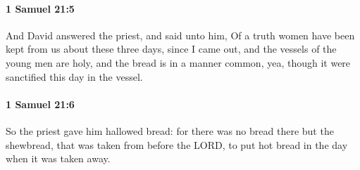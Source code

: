 		\paragraph{1 Samuel 21:5} %
			\label{1SAMUEL-21-5}

			And David answered the priest, and said unto him, Of a truth women have been kept from us about these three days, since I came out, and the vessels of the young men are holy, and the bread is in a manner common, yea, though it were sanctified this day in the vessel.


		\paragraph{1 Samuel 21:6} %
			\label{1SAMUEL-21-6}

			So the priest gave him hallowed bread: for there was no bread there but the shewbread, that was taken from before the LORD, to put hot bread in the day when it was taken away.

